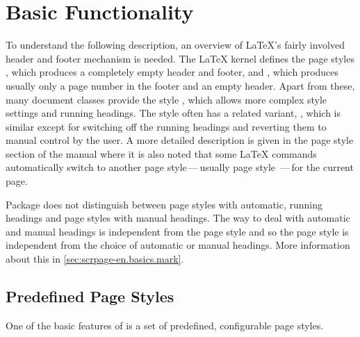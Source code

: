 \section{Basic Functionality}\label{sec:scrpage-en.basics}

\begin{Explain}%
  To understand the following description, an overview of {\LaTeX}'s fairly
  involved header and footer mechanism is needed.  The {\LaTeX} kernel defines
  the page styles , which produces a completely empty header
  and footer, and , which produces usually only a page number
  in the footer and an empty header.  Apart from these, many document classes
  provide the style , which allows more complex style
  settings and running
  headings.  The
   style often has a related variant,
  , which is similar except for switching off the
  running headings and reverting them to manual control
  by the user.  A more detailed description is given in the page style section
  of the \KOMAScript{} manual where it is also noted that some {\LaTeX}
  commands automatically switch to another page style\,---\,usually page style
  \,---\,for the current page.
\end{Explain}


Package  does not distinguish between page styles with
automatic, running headings and page styles with manual headings. The way to
deal with automatic and manual headings is independent from the page style and
so the page style is independent from the choice of automatic or manual
headings. More information about this in \autoref{sec:scrpage-en.basics.mark}.

  
\subsection{Predefined Page Styles}\label{sec:scrpage-en.basics.buildIn}

One of the basic features of  is a set of predefined,
configurable page styles.


